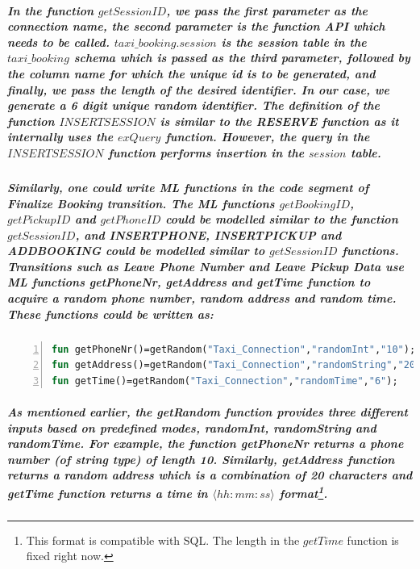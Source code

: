 \subparagraph*{\textnormal{In the function $\mathit{getSessionID}$, we pass the first parameter as the connection name, the second parameter is the function API which needs to be called. $\mathit{taxi\_booking.session}$ is the session table in the $\mathit{taxi\_booking}$ schema which is passed as the third parameter, followed by the column name for which the unique id is to be generated, and finally, we pass the length of the desired identifier. In our case, we generate a 6 digit unique random identifier. The definition of the function $\mathit{INSERTSESSION}$ is similar to the \textit{RESERVE} function as it internally uses the $\mathit{exQuery}$ function. However, the query in the $\mathit{INSERTSESSION}$ function performs insertion in the $\mathit{session}$ table.}}

\subparagraph*{\textnormal{Similarly, one could write ML functions in the code segment of \textit{Finalize Booking} transition. The ML functions $\mathit{getBookingID}$, $\mathit{getPickupID}$ and $\mathit{getPhoneID}$ could be modelled similar to the function $\mathit{getSessionID}$, and \textit{INSERTPHONE}, \textit{INSERTPICKUP} and \textit{ADDBOOKING} could be modelled similar to $\mathit{getSessionID}$ functions. Transitions such as \textit{Leave Phone Number} and \textit{Leave Pickup Data} use ML functions \textit{getPhoneNr}, \textit{getAddress} and \textit{getTime} function to acquire a random phone number, random address and random time. These functions could be written as:}}

\subparagraph*{}
\begin{lstlisting}[showstringspaces=false, language = ML, caption = {Functions for acquiring random phone number, random address and random time}, captionpos=b, label = lst:DBN_Impl_Leave_Phone,numbers=left,
stepnumber=1]
fun getPhoneNr()=getRandom("Taxi_Connection","randomInt","10");
fun getAddress()=getRandom("Taxi_Connection","randomString","20");
fun getTime()=getRandom("Taxi_Connection","randomTime","6");
\end{lstlisting}

\subparagraph*{\textnormal{As mentioned earlier, the \textit{getRandom} function provides three different inputs based on predefined modes, \textit{randomInt}, \textit{randomString} and \textit{randomTime}. For example, the function \textit{getPhoneNr} returns a phone number (of string type) of length 10. Similarly, \textit{getAddress} function returns a random address which is a combination of 20 characters and \textit{getTime} function returns a time in $\langle hh:mm:ss \rangle$ format\footnote{This format is compatible with SQL. The length in the $\mathit{getTime}$ function is fixed right now.}.}}

